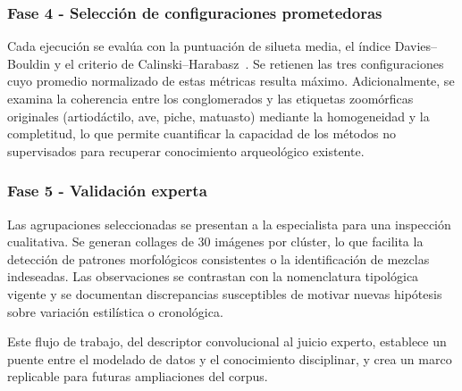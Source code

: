 \subsubsection*{Fase 4 - Selección de configuraciones prometedoras}

Cada ejecución se evalúa con la puntuación de silueta media, el índice Davies–Bouldin y el criterio de Calinski–Harabasz~\citep{rousseeuw1987silhouettes,davies1979cluster,calinski1974dendrite}.
Se retienen las tres configuraciones cuyo promedio normalizado de estas métricas resulta máximo.
Adicionalmente, se examina la coherencia entre los conglomerados y las etiquetas zoomórficas originales (artiodáctilo, ave, piche, matuasto) mediante la homogeneidad y la completitud, lo que permite cuantificar la capacidad de los métodos no supervisados para recuperar conocimiento arqueológico existente.

\subsubsection*{Fase 5 - Validación experta}

Las agrupaciones seleccionadas se presentan a la especialista para una inspección cualitativa.
Se generan collages de 30 imágenes por clúster, lo que facilita la detección de patrones morfológicos consistentes o la identificación de mezclas indeseadas.
Las observaciones se contrastan con la nomenclatura tipológica vigente y se documentan discrepancias susceptibles de motivar nuevas hipótesis sobre variación estilística o cronológica.

Este flujo de trabajo, del descriptor convolucional al juicio experto, establece un puente entre el modelado de datos y el conocimiento disciplinar, y crea un marco replicable para futuras ampliaciones del corpus.

\newpage
